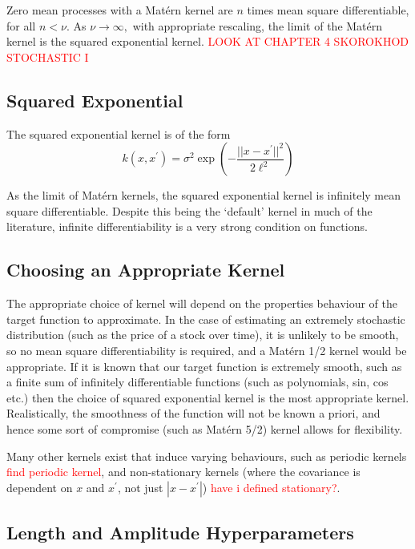 Zero mean processes with a Mat\'ern kernel are $n$ times mean square
differentiable, for all $n < \nu.$ As $\nu\to\infty,$ with appropriate
rescaling, the limit of the Mat\'ern kernel is the squared exponential
kernel.\cite[85]{rasmussen_gaussian_2008}
\textcolor{red}{LOOK AT CHAPTER 4 SKOROKHOD STOCHASTIC I}

\subsection*{Squared Exponential}

The squared exponential kernel is of the form
$$
    k(x, x^\prime)
    = \sigma^2\exp\left(-\frac{||x - x^\prime||^2}{2\ell^2}\right)
$$

As the limit of Mat\'ern kernels, the squared exponential kernel is infinitely
mean square differentiable. Despite this being the `default' kernel in much of
the literature, infinite differentiability is a very strong condition on
functions.

\subsection*{Choosing an Appropriate Kernel}

The appropriate choice of kernel will depend on the properties behaviour of the
target function to approximate. In the case of estimating an extremely
stochastic distribution (such as the price of a stock over time), it is
unlikely to be smooth, so no mean square differentiability is required, and a
Mat\'ern 1/2 kernel would be appropriate. If it is known that our target
function is extremely smooth, such as a finite sum of infinitely differentiable
functions (such as polynomials, sin, cos etc.) then the choice of squared
exponential kernel is the most appropriate kernel. Realistically, the
smoothness of the function will not be known a priori, and hence some sort of
compromise (such as Mat\'ern 5/2) kernel allows for flexibility.

Many other kernels exist that induce varying behaviours, such as periodic
kernels \textcolor{red}{find periodic kernel}, and non-stationary kernels
(where the covariance is dependent on $x$ and $x^\prime$, not just
$|x - x^\prime|$)
\textcolor{red}{have i defined stationary?}.

\subsection*{Length and Amplitude Hyperparameters}

